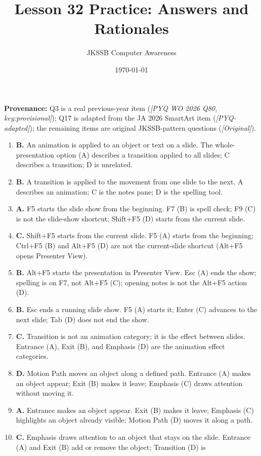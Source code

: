 \documentclass[11pt]{article}
\title{Lesson 32 Practice: Answers and Rationales}
\author{JKSSB Computer Awareness}
\date{\today}
\begin{document}
\maketitle
\noindent\textbf{Provenance:} Q3 is a real previous-year item
(\textit{[PYQ WO 2026 Q80, key:provisional]}); Q17 is adapted from the JA 2026
SmartArt item (\textit{[PYQ-adapted]}); the remaining items are original
JKSSB-pattern questions (\textit{[Original]}).
\begin{enumerate}[label=\textbf{Q\arabic*.}, leftmargin=*]
\item \textbf{B.} An animation is applied to an object or text on a slide. The
  whole-presentation option (A) describes a transition applied to all slides;
  C describes a transition; D is unrelated.
\item \textbf{B.} A transition is applied to the movement from one slide to the
  next. A describes an animation; C is the notes pane; D is the spelling tool.
\item \textbf{A.} F5 starts the slide show from the beginning. F7 (B) is spell
  check; F9 (C) is not the slide-show shortcut; Shift+F5 (D) starts from the
  current slide.
\item \textbf{C.} Shift+F5 starts from the current slide. F5 (A) starts from
  the beginning; Ctrl+F5 (B) and Alt+F5 (D) are not the current-slide shortcut
  (Alt+F5 opens Presenter View).
\item \textbf{B.} Alt+F5 starts the presentation in Presenter View. Esc (A)
  ends the show; spelling is on F7, not Alt+F5 (C); opening notes is not the
  Alt+F5 action (D).
\item \textbf{B.} Esc ends a running slide show. F5 (A) starts it; Enter (C)
  advances to the next slide; Tab (D) does not end the show.
\item \textbf{C.} Transition is not an animation category; it is the effect
  between slides. Entrance (A), Exit (B), and Emphasis (D) are the animation
  effect categories.
\item \textbf{D.} Motion Path moves an object along a defined path. Entrance
  (A) makes an object appear; Exit (B) makes it leave; Emphasis (C) draws
  attention without moving it.
\item \textbf{A.} Entrance makes an object appear. Exit (B) makes it leave;
  Emphasis (C) highlights an object already visible; Motion Path (D) moves it
  along a path.
\item \textbf{C.} Emphasis draws attention to an object that stays on the
  slide. Entrance (A) and Exit (B) add or remove the object; Transition (D) is

\end{enumerate}
\end{document}
